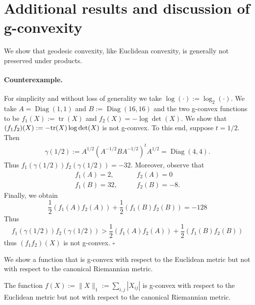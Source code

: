 \documentclass[twoside,11pt]{article}
\begin{document}
\section{Additional results and discussion of g-convexity}\label{app:g_cvx_different_metrics}
We show that geodesic convexity, like Euclidean convexity, is generally not preserved under products. 
\paragraph{Counterexample.}
For simplicity and without loss of generality we take $\log(\cdot) := \log_2(\cdot)$. We take $A = \operatorname{Diag}(1,1)$ and $B := \operatorname{Diag}(16, 16)$ and the two g-convex functions to be $f_1(X):= \operatorname{tr}(X)$ and $f_2(X) = - \log \det (X)$. We show that $(f_1 f_2)(X) := -\text{tr}(X) \log \det(X)$ is not g-convex. To this end, suppose $t=1/2$. Then 
\[
\begin{aligned}
    \gamma(1/2) := A^{1/2}\left(A^{-1/2} B A^{-1/2}\right)^t A^{1/2} = \operatorname{Diag}(4, 4).
\end{aligned}
\]
Thus $f_1(\gamma(1/2)) f_2(\gamma(1/2)) = - 32.$ Moreover, observe that 
\[
\begin{aligned}
    f_1(A) = 2, \qquad & f_2(A) = 0 
    \\f_1(B) = 32, \qquad & f_2(B) = -8.
\end{aligned}
\]
Finally, we obtain 
\[
\frac{1}{2}\left(f_1(A) f_2(A) \right) + \frac{1}{2}\left(f_1(B) f_2(B) \right) = -128
\]
Thus 
\[
f_1(\gamma(1/2)) f_2(\gamma(1/2)) > \frac{1}{2}\left(f_1(A) f_2(A) \right) + \frac{1}{2}\left(f_1(B) f_2(B)\right) 
\]
thus $(f_1 f_2)(X)$ is not g-convex.
\hfill $\square$



We show a function that is g-convex with respect to the Euclidean metric but not with respect to the canonical Riemannian metric.


\begin{prop}
    The function  $f(X) := \|X\|_1 := \sum_{i,j} |X_{ij}|$ is g-convex with respect to the Euclidean metric but not with respect to the canonical Riemannian metric.
\end{prop}
\end{document}
